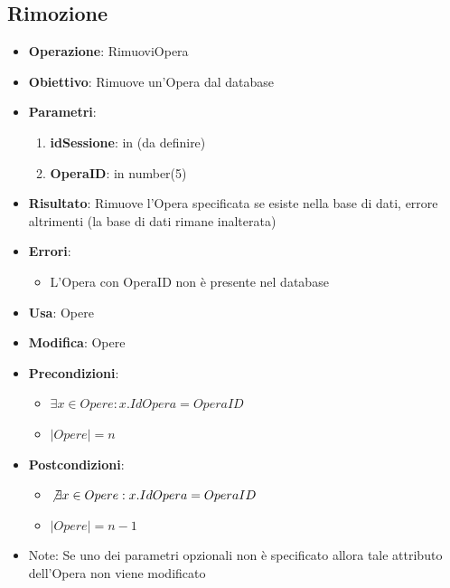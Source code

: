 \documentclass[a4paper,11pt]{article}
\begin{document}
\subsection{Rimozione}
\begin{itemize}
	\item \textbf{Operazione}: RimuoviOpera
	\item \textbf{Obiettivo}: Rimuove un'Opera dal database
	\item \textbf{Parametri}:
	\begin{enumerate}
		\item \textbf{idSessione}: in (da definire)
		\item \textbf{OperaID}: in number(5)
	\end{enumerate}
	\item \textbf{Risultato}: Rimuove l'Opera specificata se esiste nella base di dati, errore altrimenti (la base di dati rimane inalterata)
	\item \textbf{Errori}: 
	\begin{itemize}
		\item L'Opera con OperaID non è presente nel database
	\end{itemize}
	\item \textbf{Usa}: Opere
	\item \textbf{Modifica}: Opere
	\item \textbf{Precondizioni}:
	\begin{itemize}
		\item $\exists x \in Opere : x.IdOpera = OperaID$
		\item $|Opere| = n$
	\end{itemize}
	\item \textbf{Postcondizioni}:
	\begin{itemize}
		\item $\not\exists x \in Opere : x.IdOpera = OperaID$
		\item $|Opere| = n - 1$
	\end{itemize}
	\item Note: Se uno dei parametri opzionali non è specificato allora tale attributo 
	dell'Opera non viene modificato
\end{itemize}

\end{document}
